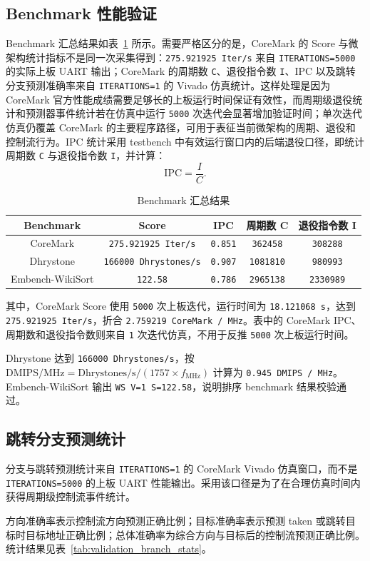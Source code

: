 ﻿\documentclass[12pt,a4paper]{ctexart}
\begin{document}
\subsection{Benchmark 性能验证}
Benchmark 汇总结果如表~\ref{tab:benchmark_summary} 所示。需要严格区分的是，CoreMark 的 Score 与微架构统计指标不是同一次采集得到：\texttt{275.921925 Iter/s} 来自 \texttt{ITERATIONS=5000} 的实际上板 UART 输出；CoreMark 的周期数 \texttt{C}、退役指令数 \texttt{I}、IPC 以及跳转分支预测准确率来自 \texttt{ITERATIONS=1} 的 Vivado 仿真统计。这样处理是因为 CoreMark 官方性能成绩需要足够长的上板运行时间保证有效性，而周期级退役统计和预测器事件统计若在仿真中运行 \texttt{5000} 次迭代会显著增加验证时间；单次迭代仿真仍覆盖 CoreMark 的主要程序路径，可用于表征当前微架构的周期、退役和控制流行为。IPC 统计采用 testbench 中有效运行窗口内的后端退役口径，即统计周期数 \texttt{C} 与退役指令数 \texttt{I}，并计算：
\[
    \mathrm{IPC}=\frac{I}{C}.
\]

\begin{table}[htbp]
    \centering
    \caption{Benchmark 汇总结果}
    \label{tab:benchmark_summary}
    \begin{tabular}{ccccc}
        \toprule
        Benchmark & Score & IPC & 周期数 C & 退役指令数 I \\
        \midrule
        CoreMark & \texttt{275.921925 Iter/s} & \texttt{0.851} & \texttt{362458} & \texttt{308288} \\
        Dhrystone & \texttt{166000 Dhrystones/s} & \texttt{0.907} & \texttt{1081810} & \texttt{980993} \\
        Embench-WikiSort & \texttt{122.58} & \texttt{0.786} & \texttt{2965138} & \texttt{2330989} \\
        \bottomrule
    \end{tabular}
\end{table}

其中，CoreMark Score 使用 \texttt{5000} 次上板迭代，运行时间为 \texttt{18.121068 s}，达到 \texttt{275.921925 Iter/s}，折合 \texttt{2.759219 CoreMark / MHz}。表中的 CoreMark IPC、周期数和退役指令数则来自 \texttt{1} 次迭代仿真，不用于反推 \texttt{5000} 次上板运行时间。\par\indent
Dhrystone 达到 \texttt{166000 Dhrystones/s}，按 \(\mathrm{DMIPS}/\mathrm{MHz}=\mathrm{Dhrystones/s}/(1757\times f_{\mathrm{MHz}})\) 计算为 \texttt{0.945 DMIPS / MHz}。Embench-WikiSort 输出 \texttt{WS V=1 S=122.58}，说明排序 benchmark 结果校验通过。

\subsection{跳转分支预测统计}
分支与跳转预测统计来自 \texttt{ITERATIONS=1} 的 CoreMark Vivado 仿真窗口，而不是 \texttt{ITERATIONS=5000} 的上板 UART 性能输出。采用该口径是为了在合理仿真时间内获得周期级控制流事件统计。\par\indent
方向准确率表示控制流方向预测正确比例；目标准确率表示预测 taken 或跳转目标时目标地址正确比例；总体准确率为综合方向与目标后的控制流预测正确比例。统计结果见表~\ref{tab:validation_branch_stats}。
\end{document}
